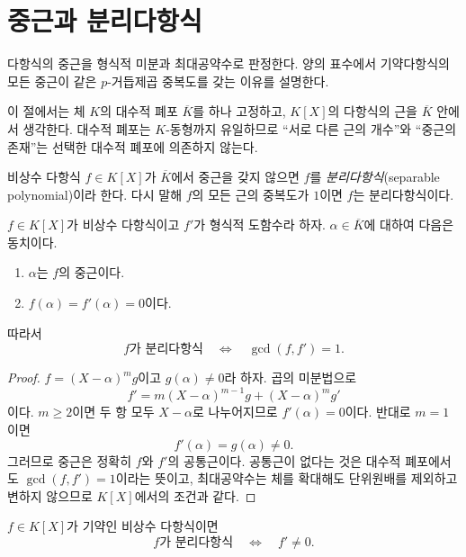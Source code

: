 \section{중근과 분리다항식}
\label{sec:separable-polynomials}

\begin{learninggoal}
다항식의 중근을 형식적 미분과 최대공약수로 판정한다. 양의 표수에서 기약다항식의 모든 중근이 같은 $p$-거듭제곱 중복도를 갖는 이유를 설명한다.
\end{learninggoal}

이 절에서는 체 $K$의 대수적 폐포 $\overline K$를 하나 고정하고, $K[X]$의 다항식의 근을 $\overline K$ 안에서 생각한다. 대수적 폐포는 $K$-동형까지 유일하므로 ``서로 다른 근의 개수''와 ``중근의 존재''는 선택한 대수적 폐포에 의존하지 않는다.

\begin{definition}[분리다항식]
비상수 다항식 $f\in K[X]$가 $\overline K$에서 중근을 갖지 않으면 $f$를 \emph{분리다항식}(separable polynomial)이라 한다. 다시 말해 $f$의 모든 근의 중복도가 $1$이면 $f$는 분리다항식이다.
\end{definition}

\begin{proposition}[중근 판정]
$f\in K[X]$가 비상수 다항식이고 $f'$가 형식적 도함수라 하자. $\alpha\in\overline K$에 대하여 다음은 동치이다.
\begin{enumerate}[label=(\roman*)]
  \item $\alpha$는 $f$의 중근이다.
  \item $f(\alpha)=f'(\alpha)=0$이다.
\end{enumerate}
따라서
\[
  f\text{가 분리다항식}
  \quad\Longleftrightarrow\quad
  \gcd(f,f')=1.
\]
\end{proposition}

\begin{proof}
$f=(X-\alpha)^m g$이고 $g(\alpha)\ne0$라 하자. 곱의 미분법으로
\[
  f'=m(X-\alpha)^{m-1}g+(X-\alpha)^m g'
\]
이다. $m\ge2$이면 두 항 모두 $X-\alpha$로 나누어지므로 $f'(\alpha)=0$이다. 반대로 $m=1$이면
\[
  f'(\alpha)=g(\alpha)\ne0.
\]
그러므로 중근은 정확히 $f$와 $f'$의 공통근이다. 공통근이 없다는 것은 대수적 폐포에서도 $\gcd(f,f')=1$이라는 뜻이고, 최대공약수는 체를 확대해도 단위원배를 제외하고 변하지 않으므로 $K[X]$에서의 조건과 같다.
\end{proof}

\begin{corollary}
$f\in K[X]$가 기약인 비상수 다항식이면
\[
  f\text{가 분리다항식}
  \quad\Longleftrightarrow\quad
  f'\ne0.
\]
\end{corollary}

